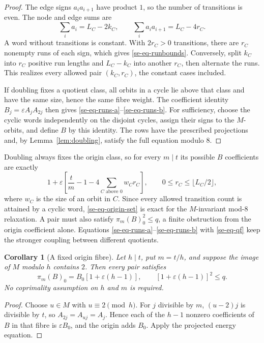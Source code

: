 \documentclass[11pt]{article}
\newtheorem{corollary}[theorem]{Corollary}
\theoremstyle{definition}
\theoremstyle{remark}
\begin{document}
\begin{proof}
The edge signs $a_i a_{i+1}$ have product $1$, so the number of
transitions is even.  The node and edge sums are
\[
 \sum_i a_i=L_C-2k_C,
 \qquad \sum_i a_i a_{i+1}=L_C-4r_C.
\]
A word without transitions is constant.  With $2r_C>0$ transitions,
there are $r_C$ nonempty runs of each sign, which gives
\eqref{se-eq-runbounds}.  Conversely, split $k_C$ into $r_C$ positive
run lengths and $L_C-k_C$ into another $r_C$, then alternate the runs.
This realizes every allowed pair $(k_C,r_C)$, the constant cases
included.

If doubling fixes a quotient class, all orbits in a cycle lie above that
class and have the same size, hence the same fibre weight.  The
coefficient identity $B_j=\varepsilon A_jA_{2j}$ then gives
\eqref{se-eq-runs-a}--\eqref{se-eq-runs-b}.
For sufficiency, choose the cyclic words independently on the disjoint
cycles, assign their signs to the $M$-orbits, and define $B$ by this
identity.  The rows have the prescribed projections and, by
Lemma~\ref{lem:doubling}, satisfy the full equation modulo $8$.
\end{proof}

Doubling always fixes the origin class, so for every $m\mid t$ its
possible $B$ coefficients are exactly
\begin{equation}
 1+\varepsilon\left[\frac{t}{m}-1-
       4\sum_{C\text{ above }0} w_Cr_C\right],
 \qquad 0\le r_C\le\lfloor L_C/2\rfloor,
 \label{se-eq-origin-set}
\end{equation}
where $w_C$ is the size of an orbit in $C$.  Since every allowed
transition count is attained by a cyclic word,
\eqref{se-eq-origin-set} is exact for the $M$-invariant mod-$8$
relaxation.  A pair must also satisfy $\pi_m(B)_0^2\le q$, a finite
obstruction from the origin coefficient alone.  Equations
\eqref{se-eq-runs-a}--\eqref{se-eq-runs-b} with \eqref{se-eq-qf} keep
the stronger coupling between different quotients.

\begin{corollary}[A fixed origin fibre]
\label{se-cor-fixed}
Let $h\mid t$, put $m=t/h$, and suppose the image of $M$ modulo $h$
contains $2$.  Then every pair satisfies
\[
 \pi_m(B)_0=B_0[1+\varepsilon(h-1)],
 \qquad [1+\varepsilon(h-1)]^2\le q.
\]
No coprimality assumption on $h$ and $m$ is required.
\end{corollary}

\begin{proof}
Choose $u\in M$ with $u\equiv2\pmod h$.  For $j$ divisible by $m$,
$(u-2)j$ is divisible by $t$, so $A_{2j}=A_{uj}=A_j$.
Hence each of the $h-1$ nonzero coefficients of $B$ in that fibre is
$\varepsilon B_0$, and the origin adds $B_0$.  Apply the projected
energy equation.
\end{proof}
\end{document}
